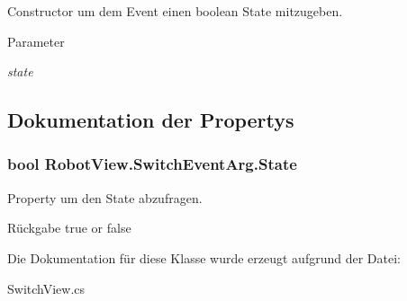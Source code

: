 Constructor um dem Event einen boolean State mitzugeben. 


\begin{DoxyParams}{Parameter}
\item[{\em state}]\end{DoxyParams}


\subsection{Dokumentation der Propertys}
\hypertarget{class_robot_view_1_1_switch_event_arg_a6c1441d3012ab67cbff2ffe52f3ad625}{
\subsubsection[{State}]{\setlength{\rightskip}{0pt plus 5cm}bool RobotView.SwitchEventArg.State}}
\label{class_robot_view_1_1_switch_event_arg_a6c1441d3012ab67cbff2ffe52f3ad625}


Property um den State abzufragen. 

\begin{DoxyReturn}{Rückgabe}
true or false 
\end{DoxyReturn}


Die Dokumentation für diese Klasse wurde erzeugt aufgrund der Datei:\begin{DoxyCompactItemize}
\item 
SwitchView.cs\end{DoxyCompactItemize}
